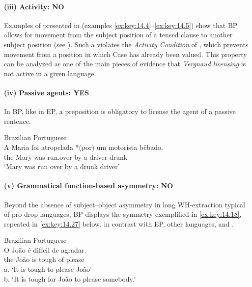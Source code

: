 \documentclass[output=paper]{langsci/langscibook}
\begin{document}
\paragraph*{(iii) Activity: NO}

Examples of  presented in  (examples
\eqref{ex:key:14.4}--\eqref{ex:key:14.5}) show that \gls{BP} allows for
movement from the subject position of a tensed clause to another subject
position (see \citealt{NunesMartins2010}). Such a  violates the
\emph{Activity Condition} of \textcite{Chomsky2000,Chomsky2001}, which prevents
movement from a position in which Case has already been valued. This property
can be analyzed as one of the main pieces of evidence that \emph{Vergnaud
licensing} is not active in a given language.

\paragraph*{(iv) Passive agents: YES}

In \gls{BP}, like in \gls{EP}, a preposition is obligatory to license the
agent of a passive sentence.

\ea\label{ex:key:14.26}Brazilian Portuguese\\
    \gll    A Maria foi atropelada *(por) um motorista bêbado.\\
            the Mary was run.over \hphantom{*(}by a driver drunk\\
    \glt    ‘Mary was run over by a drunk driver’\\
\z

\paragraph*{(v) Grammatical function-based asymmetry: NO}

Beyond the absence of subject--object asymmetry in long
WH-extraction typical
of pro-drop languages, \gls{BP} displays the symmetry exemplified in
\eqref{ex:key:14.18}, repeated in \eqref{ex:key:14.27} below, in contrast with \gls{EP},
other  languages, and .\newpage

\ea%
    \label{ex:key:14.27}Brazilian Portuguese\\
    \gll    O João é difícil de agradar.\\
            the João is tough of please\\
	\glt    a. ‘It is tough to please João’\\
            b. ‘It is tough for João to please somebody.’
\z
\end{document}
